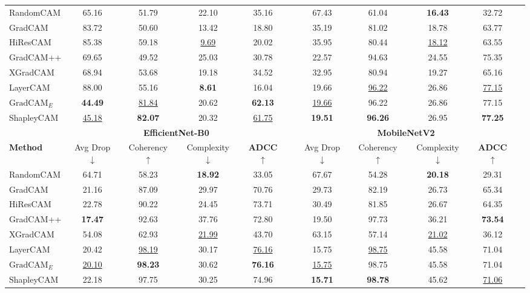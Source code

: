 \begin{table*}[htbp]
\begin{tabular}{l cccc c cccc c}
\hline
RandomCAM & 65.16 & 51.79 & 22.10 & 35.16 & & 67.43 & 61.04 & \textbf{16.43} & 32.72 \\
GradCAM & 83.72 & 50.60 & 13.42 & 18.80 & & 35.19 & 81.02 & 18.78 & 63.77 \\
HiResCAM & 85.38 & 59.18 & \underline{9.69} & 20.02 & & 35.95 & 80.44 & \underline{18.12} & 63.55 \\
GradCAM++ & 69.65 & 49.52 & 25.03 & 30.78 & & 22.57 & 94.63 & 24.55 & 75.35 \\
XGradCAM & 68.94 & 53.68 & 19.18 & 34.52 & & 32.95 & 80.94 & 19.27 & 65.16 \\
LayerCAM & 88.00 & 55.16 & \textbf{8.61} & 16.04 & & 19.66 & \underline{96.22} & 26.86 & \underline{77.15} \\
$\text{GradCAM}_{E}$ & \textbf{44.49} & \underline{81.84} & 20.62 & \textbf{62.13} & & \underline{19.66} & 96.22 & 26.86 & 77.15 \\
ShapleyCAM & \underline{45.18} & \textbf{82.07} & 20.32 & \underline{61.75} & & \textbf{19.51} & \textbf{96.26} & 26.95 & \textbf{77.25} \\
\hline
& \multicolumn{4}{c}{\textbf{EfficientNet-B0}} & & \multicolumn{4}{c}{\textbf{MobileNetV2}} \\
\cline{2-5} \cline{7-10}
\textbf{Method} & Avg Drop $\downarrow$ & Coherency $\uparrow$ & Complexity $\downarrow$ & \textbf{ADCC} $\uparrow$ & & Avg Drop $\downarrow$ & Coherency $\uparrow$ & Complexity $\downarrow$ & \textbf{ADCC} $\uparrow$ \\
\hline
RandomCAM & 64.71 & 58.23 & \textbf{18.92} & 33.05 & & 67.67 & 54.28 & \textbf{20.18} & 29.31 \\
GradCAM & 21.16 & 87.09 & 29.97 & 70.76 & & 29.73 & 82.19 & 26.73 & 65.34 \\
HiResCAM & 22.78 & 90.22 & 24.45 & 73.71 & & 30.49 & 81.85 & 26.67 & 64.35 \\
GradCAM++ & \textbf{17.47} & 92.63 & 37.76 & 72.80 & & 19.50 & 97.73 & 36.21 & \textbf{73.54} \\
XGradCAM & 54.08 & 62.93 & \underline{21.99} & 43.70 & & 63.15 & 57.14 & \underline{21.02} & 36.12 \\
LayerCAM & 20.42 & \underline{98.19} & 30.17 & \underline{76.16} & & 15.75 & \underline{98.75} & 45.58 & 71.04 \\
$\text{GradCAM}_{E}$ & \underline{20.10} & \textbf{98.23} & 30.62 & \textbf{76.16} & & \underline{15.75} & 98.75 & 45.58 & 71.04 \\
ShapleyCAM & 22.18 & 97.75 & 30.25 & 74.96 & & \textbf{15.71} & \textbf{98.78} & 45.62 & \underline{71.06} \\
\hline
\end{tabular}
\end{table*}